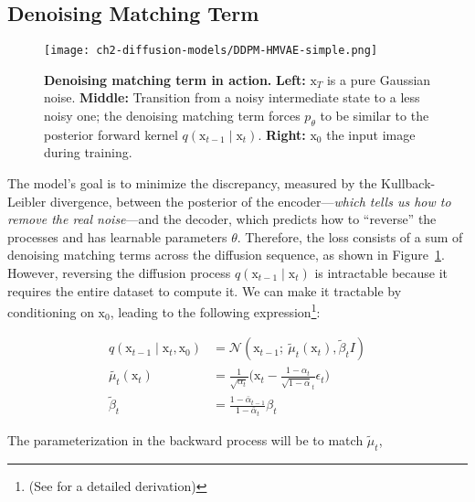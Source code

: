 \subsection{Denoising Matching Term}

\begin{figure}[t]
  \centering
  \texttt{[image: ch2-diffusion-models/DDPM-HMVAE-simple.png]}
  \captionsetup{width=\textwidth} %
  \caption{\textbf{Denoising matching term in action.} \textbf{Left:} $\mathrm{x}_{T}$ is a pure Gaussian noise. \textbf{Middle:} Transition from a noisy intermediate state to a less noisy one; the denoising matching term forces $p_{\theta}$ to be similar to the posterior forward kernel $q(\mathrm{x}_{t-1}\mid \mathrm{x}_{t})$. \textbf{Right:} $\mathrm{x}_{0}$ the input image during training.}
  \label{fig:ddpm-denoising-term}
\end{figure}

The model's goal is to minimize the discrepancy, measured by the Kullback-Leibler divergence, between the posterior of the encoder---\textit{which tells us how to remove the real noise}---and the decoder, which predicts how to ``reverse'' the processes and has learnable parameters $\theta$. Therefore, the loss consists of a sum of denoising matching terms across the diffusion sequence, as shown in Figure~\ref{fig:ddpm-denoising-term}. \\

\noindent However, reversing the diffusion process $q(\mathrm{x}_{t-1}\mid\mathrm{x}_{t})$ is intractable because it requires the entire dataset to compute it. We can make it tractable by conditioning on $\mathrm{x}_{0}$, leading to the following expression\footnote{(See \citep{weng2021diffusion} for a detailed derivation)}:

\begin{align}\label{eqn:reverse-forward-process}
    q(\mathrm{x}_{t-1}\mid\mathrm{x}_{t}, \mathrm{x}_{0}) &= \mathcal{N}(\mathrm{x}_{t-1};~\tilde{\mu}_{t}(\mathrm{x}_{t}), \tilde{\beta}_{t}I) \\
    \tilde{\mu_{t}}(\mathrm{x}_{t}) &= \frac{1}{\sqrt{\alpha_{t}}}\big(\mathrm{x}_{t} - \frac{1 - \alpha_{t}}{\sqrt{1 - \bar{\alpha}}_{t}}\epsilon_{t}\big) \\
    \tilde{\beta}_{t} &= \frac{1-\bar{\alpha}_{t-1}}{1-\bar{\alpha}_{t}}\beta_{t}
\end{align}

\noindent The parameterization in the backward process will be to match
$\tilde{\mu}_{t}$, 

